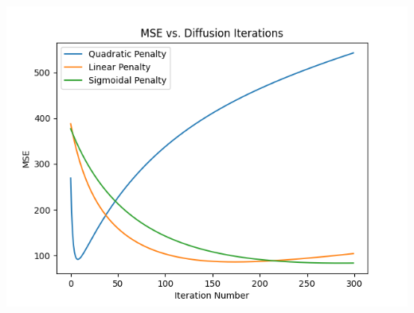 \documentclass{article}
\begin{document}
  \begin{center}
    \includegraphics[scale=0.5]{../generated_images/MSE_test3.png}\\
  \end{center}
\end{document}
